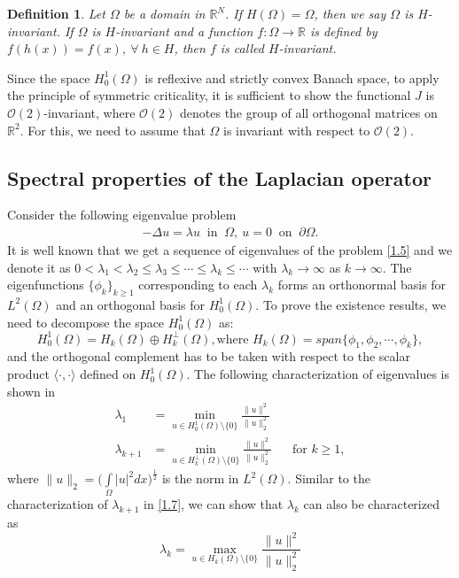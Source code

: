 \documentclass[11pt]{amsart}
\numberwithin{equation}{section}
\newtheorem{definition}{Definition}
\newcommand{\R}{\mathbb{R}}
\newcommand{\h}{H^1_0(\Omega)}
\newcommand{\1}{\frac{1}{2}}
\begin{document}
	\begin{definition}
		Let $ \Omega $ be a domain in $ \mathbb{R}^N $. If $ H(\Omega) = \Omega $, then we say $\Omega $ is $ H $-invariant. If $\Omega$ is $H$-invariant and a function $f: \Omega \to \mathbb{R}$ is defined by $f(h(x))=f(x), \ \forall \ h \in H$, then $f$ is called $H$-invariant.
	\end{definition}
	
	Since the space $\h$ is reflexive and strictly convex Banach space, to apply the principle of symmetric criticality, it is sufficient to show the functional $J$ is $\mathcal{O}(2)$-invariant, where $\mathcal{O}(2)$ denotes the group of all orthogonal matrices on $\R^2$. For this, we need to assume that $\Omega$ is invariant with respect to $\mathcal{O}(2)$.
	
	\subsection{Spectral properties of the Laplacian operator}
	Consider the following eigenvalue problem
	\begin{align}  \label{1.5}
		-\Delta u = \lambda u \ \text{ in } \ \Omega, \ u=0 \ \text{ on } \ \partial \Omega. 
	\end{align}
	It is well known that we get a sequence of eigenvalues of the problem \eqref{1.5} and we denote it as $0<\lambda_1<\lambda_2 \leq \lambda_3 \leq \cdots \leq \lambda_k \leq \cdots $ with $\lambda_k \rightarrow \infty$ as $k \rightarrow \infty$.
	The eigenfunctions $\{ \phi_k\}_{k \geq 1}$ corresponding to each $\lambda_k$ forms an orthonormal basis for $L^2(\Omega)$ and an orthogonal basis for $H^1_0(\Omega)$. To prove the existence results, we need to decompose the space $H^1_0(\Omega)$ as:
	\[ H^1_0(\Omega) = H_k(\Omega) \oplus H_k^{\perp} (\Omega), \text{where } H_k(\Omega) = span\{ \phi_1, \phi_2, \cdots, \phi_k\}, \]
	and the orthogonal complement has to be taken with respect to the scalar product $\langle \cdot,\cdot \rangle$ defined on $\h$. The following characterization of eigenvalues is shown in \cite{Mcowen}
	\begin{align} 
		\lambda_1 &= \min_{u \in H^1_0(\Omega) \setminus \{0\}} \frac{\|u\|^2}{\|u\|_2^2} \label{1.6}\\
		\lambda_{k+1} &=  \min_{u \in H_k^\perp (\Omega) \setminus \{0 \}}
		\frac{\|u\|^2}{\|u\|_2^2}   \text{ ~~~  for } k \geq 1,  \label{1.7}
	\end{align}
	where $\|u\|_2 = \Bigg( \int\limits_\Omega |u|^2dx\Bigg)^{\frac{1}{2}}$ is the norm in $L^2(\Omega)$. Similar to the characterization of $\lambda_{k+1}$ in \eqref{1.7}, we can show that $\lambda_k$ can also be characterized as
	\begin{equation}
		\lambda_k = \max_{u \in H_k(\Omega) \setminus \{0\} } \frac{\|u\|^2}{\|u\|^2_2} \label{1.8}
	\end{equation}
	
\end{document}
